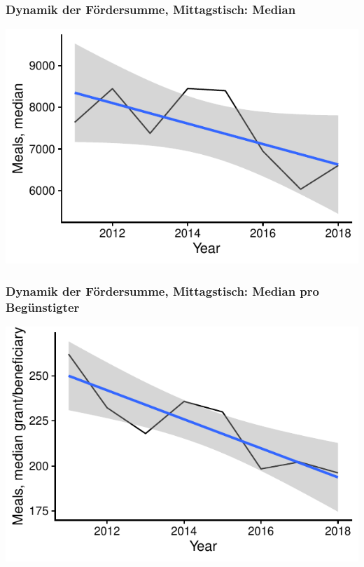 \begin{frame}[fragile]
\frametitle{Dynamik der Fördersumme, Mittagstisch: Median}



{\centering \includegraphics[width=\maxwidth]{figure/beamer-FundamentalDynamicsMealsMedian-1} 

}



\end{frame}

\begin{frame}[fragile]
\frametitle{Dynamik der Fördersumme, Mittagstisch: Median pro Begünstigter}


{\centering \includegraphics[width=\maxwidth]{figure/beamer-FundamentalDynamicsMealsMedianPerBene-1} 

}



\end{frame}

